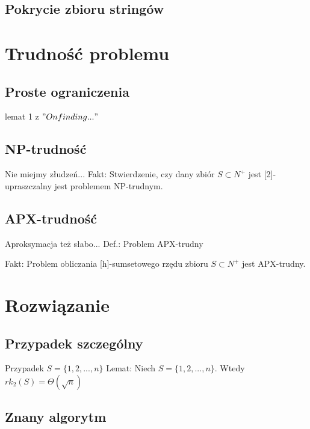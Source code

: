 \documentclass{beamer}
\begin{document}
	\subsection{Pokrycie zbioru stringów}
		\begin{frame}
		\end{frame}
		
\section{Trudność problemu}
	\subsection{Proste ograniczenia}
		\begin{frame}
			lemat 1 z $"On finding..."$
		\end{frame}
		
	\subsection{NP-trudność}
		\begin{frame}{Nie miejmy złudzeń...}
			Fakt: Stwierdzenie, czy dany zbiór $ S \subset N^{+} $ jest [2]-upraszczalny jest problemem NP-trudnym.
		\end{frame}
		
	\subsection{APX-trudność}
		\begin{frame}{Aproksymacja też słabo...}
			Def.: Problem APX-trudny
		
			Fakt: Problem obliczania [h]-sumsetowego rzędu zbioru $ S \subset N^{+} $ jest APX-trudny.
		\end{frame}
		
\section{Rozwiązanie}
	\subsection{Przypadek szczególny}
		\begin{frame}{Przypadek $ S = \lbrace 1,2,...,n \rbrace $}
			Lemat: Niech $ S = \lbrace 1,2,...,n \rbrace $. Wtedy $ rk_{2}(S) = \Theta(\sqrt{n}) $
		\end{frame}
		
	\subsection{Znany algorytm}
		\begin{frame}
		\end{frame}
		
\end{document}
